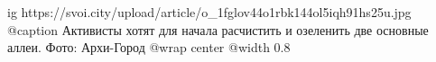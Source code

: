  
 
 
 
 

\ifcmt
  ig https://svoi.city/upload/article/o_1fglov44o1rbk144ol5iqh91hs25u.jpg
  @caption Активисты хотят для начала расчистить и озеленить две основные аллеи. Фото: Архи-Город
  @wrap center
  @width 0.8
\fi
